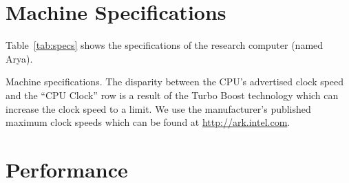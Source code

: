 \documentclass[conference]{IEEEtran}
\begin{document}
\section{Machine Specifications}
Table~\ref{tab:specs} shows the specifications of the research computer (named Arya).

\begin{table}[!htb]
	\centering
	\caption{Machine specifications. The disparity between the CPU's advertised clock speed and the ``CPU Clock'' row is a result of the Turbo Boost technology which can increase the clock speed to a limit. We use the manufacturer's published maximum clock speeds which can be found at \url{http://ark.intel.com}.}
	\label{tab:specs}
\end{table}

\section{Performance}



\end{document}
